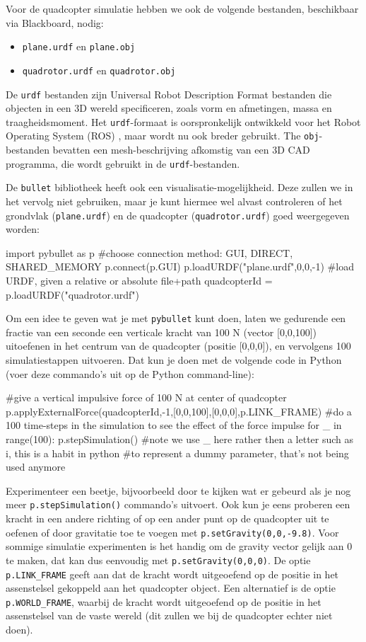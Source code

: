 \documentclass[a4paper,11pt]{article}
\begin{document}
Voor de quadcopter simulatie hebben we ook de volgende bestanden, beschikbaar via Blackboard, nodig:
\begin{itemize}
\item \texttt{plane.urdf} en \texttt{plane.obj}
\item \texttt{quadrotor.urdf} en \texttt{quadrotor.obj}
\end{itemize}
De \texttt{urdf} bestanden zijn Universal Robot Description Format bestanden die objecten in een 3D wereld specificeren, zoals vorm en afmetingen, massa en traagheidsmoment. Het \texttt{urdf}-formaat is oorspronkelijk ontwikkeld voor het Robot Operating System (ROS) \cite{ros}, maar wordt nu ook breder gebruikt. The \texttt{obj}-bestanden bevatten een mesh-beschrijving afkomstig van een 3D CAD programma, die wordt gebruikt in de \texttt{urdf}-bestanden.

De \texttt{bullet} bibliotheek heeft ook een visualisatie-mogelijkheid. Deze
zullen we in het vervolg niet gebruiken, maar je kunt hiermee wel alvast
controleren of het grondvlak (\texttt{plane.urdf}) en de quadcopter
(\texttt{quadrotor.urdf}) goed weergegeven worden:
\begin{pyconsole}
import pybullet as p
#choose connection method: GUI, DIRECT, SHARED_MEMORY
p.connect(p.GUI)
p.loadURDF("plane.urdf",0,0,-1)
#load URDF, given a relative or absolute file+path
quadcopterId = p.loadURDF("quadrotor.urdf")

\end{pyconsole}
Om een idee te geven wat je met \texttt{pybullet} kunt doen, laten we gedurende
een fractie van een seconde een verticale kracht van 100 N (vector [0,0,100]) uitoefenen in het
centrum van de quadcopter (positie [0,0,0]), en vervolgens 100 simulatiestappen uitvoeren. Dat
kun je doen met de volgende code in Python (voer deze commando's uit op de
Python command-line): 
\begin{pyconsole}
#give a vertical impulsive force of 100 N at center of quadcopter
p.applyExternalForce(quadcopterId,-1,[0,0,100],[0,0,0],p.LINK_FRAME)
#do a 100 time-steps in the simulation to see the effect of the force impulse 
for _ in range(100): p.stepSimulation()
#note we use _ here rather then a letter such as i, this is a habit in python
#to represent a dummy parameter, that's not being used anymore

\end{pyconsole}
Experimenteer een beetje, bijvoorbeeld door te kijken wat er gebeurd
als je nog meer \texttt{p.stepSimulation()} commando's uitvoert. Ook kun
je eens proberen een kracht in een andere richting of op een ander punt op de
quadcopter uit te oefenen of door gravitatie toe te voegen met \sloppy 
\texttt{p.setGravity(0,0,-9.8)}. Voor sommige simulatie experimenten is het
handig om de gravity vector gelijk aan 0 te maken, dat kan dus eenvoudig met
\texttt{p.setGravity(0,0,0)}. De optie \texttt{p.LINK\_FRAME} geeft aan dat de
kracht wordt uitgeoefend op de positie in het assenstelsel gekoppeld aan het
quadcopter object. Een alternatief is de optie \texttt{p.WORLD\_FRAME}, waarbij
de kracht wordt uitgeoefend op de positie in het assenstelsel van de vaste
wereld (dit zullen we bij de quadcopter echter niet doen).
\end{document}
